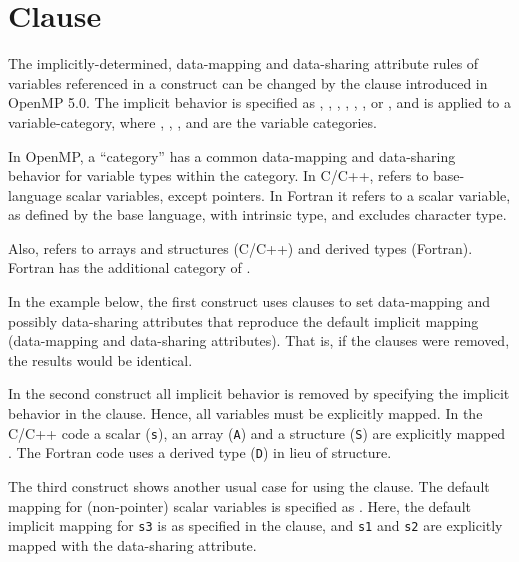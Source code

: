 \pagebreak
\section{ Clause}
\label{sec:defaultmap}

The implicitly-determined, data-mapping and data-sharing attribute
rules of variables referenced in a  construct can be
changed by the  clause introduced in OpenMP 5.0.
The implicit behavior is specified as
, , , ,
, ,  or ,
and is applied to a variable-category, where
, , ,
and  are the variable categories. 

In OpenMP, a ``category'' has a common data-mapping and data-sharing 
behavior for variable types within the category.
In C/C++,  refers to base-language scalar variables, except pointers.
In Fortran it refers to a scalar variable, as defined by the base language, 
with intrinsic type, and excludes character type.

Also,  refers to arrays and structures (C/C++) and
derived types (Fortran). Fortran has the additional category of .

In the example below, the first  construct uses  
clauses to set data-mapping and possibly data-sharing attributes that reproduce 
the default implicit mapping (data-mapping and data-sharing attributes).  That is, 
if the  clauses were removed, the results would be identical.

In the second  construct all implicit behavior is removed
by specifying the  implicit behavior in the  clause.
Hence, all variables must be explicitly mapped.  
In the C/C++ code a scalar (\texttt{s}), an array (\texttt{A}) and a structure 
(\texttt{S}) are explicitly mapped .  
The Fortran code uses a derived type (\texttt{D}) in lieu of structure.

The third  construct shows another usual case for using the  clause.
The default mapping for (non-pointer) scalar variables is specified as .
Here, the default implicit mapping for \texttt{s3} is  as specified 
in the  clause, and \texttt{s1} and \texttt{s2} are explicitly 
mapped with the  data-sharing attribute.

